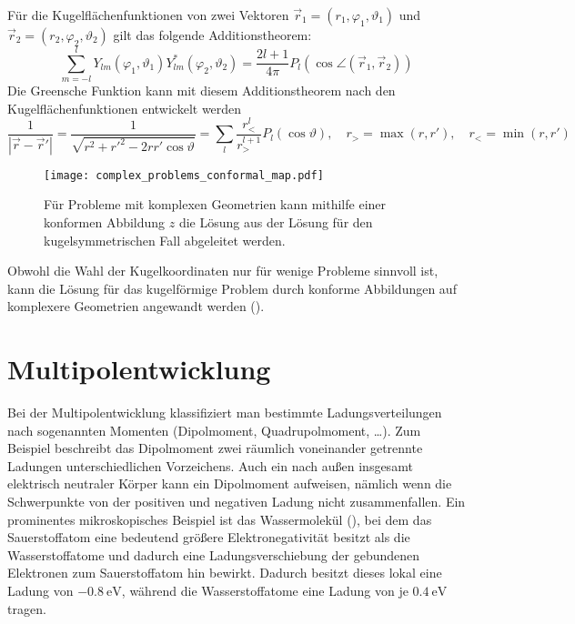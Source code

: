 Für die Kugelflächenfunktionen von zwei Vektoren $\vec {r}_{1}=\left(r_{1},\varphi _{1},\vartheta _{1}\right)$ und $\vec {r}_{2}=\left(r_{2},\varphi _{2},\vartheta _{2}\right)$ gilt das folgende Additionstheorem:
\begin{equation*}
	\sum _{m=-l}^{l}Y_{lm}\left(\varphi _{1},\vartheta _{1}\right)Y_{lm}^{*}\left(\varphi _{2},\vartheta _{2}\right)=\frac{2l+1}{4\pi }P_{l}\left(\cos \angle \left(\vec {r}_{1},\vec {r}_{2}\right)\right)
\end{equation*}
Die Greensche Funktion kann mit diesem Additionstheorem nach den Kugelflächenfunktionen entwickelt werden
\begin{equation*}
	\frac{1}{\left| \vec {r}-\vec {r}'\right| }=\frac{1}{\sqrt{r^{2}+r'^{2}-2rr'\cos \vartheta }}=\sum _{l}\frac{r_{<}^{l}}{r_{>}^{l+1}}P_{l}\left(\cos \vartheta \right),\quad 
		r_{>}=\max \left(r,r'\right) ,\quad
		r_{<}=\min \left(r,r'\right)
\end{equation*}


\begin{figure}[htb]
	\centering
	\texttt{[image: complex\_problems\_conformal\_map.pdf]}
	\caption{Für Probleme mit komplexen Geometrien kann mithilfe einer konformen Abbildung $z$ die Lösung aus der Lösung für den kugelsymmetrischen Fall abgeleitet werden. }
	\label{fig:complex_problems_conformal_map}
\end{figure}

Obwohl die Wahl der Kugelkoordinaten nur für wenige Probleme sinnvoll ist, kann die Lösung für das kugelförmige Problem durch konforme Abbildungen auf komplexere Geometrien angewandt werden ().

\section{Multipolentwicklung}

Bei der Multipolentwicklung klassifiziert man bestimmte Ladungsverteilungen nach sogenannten Momenten (Dipolmoment, Quadrupolmoment, {\ldots}). Zum Beispiel beschreibt das Dipolmoment zwei räumlich voneinander getrennte Ladungen unterschiedlichen Vorzeichens. Auch ein nach außen insgesamt elektrisch neutraler Körper kann ein Dipolmoment aufweisen, nämlich wenn die Schwerpunkte von der positiven und negativen Ladung nicht zusammenfallen. Ein prominentes mikroskopisches Beispiel ist das Wassermolekül (), bei dem das Sauerstoffatom eine bedeutend größere Elektronegativität besitzt als die Wasserstoffatome und dadurch eine Ladungsverschiebung der gebundenen Elektronen zum Sauerstoffatom hin bewirkt. Dadurch besitzt dieses lokal eine Ladung von $\SI{-0.8}{\eV}$, während die Wasserstoffatome eine Ladung von je $\SI{+0.4}{\eV}$ tragen.

